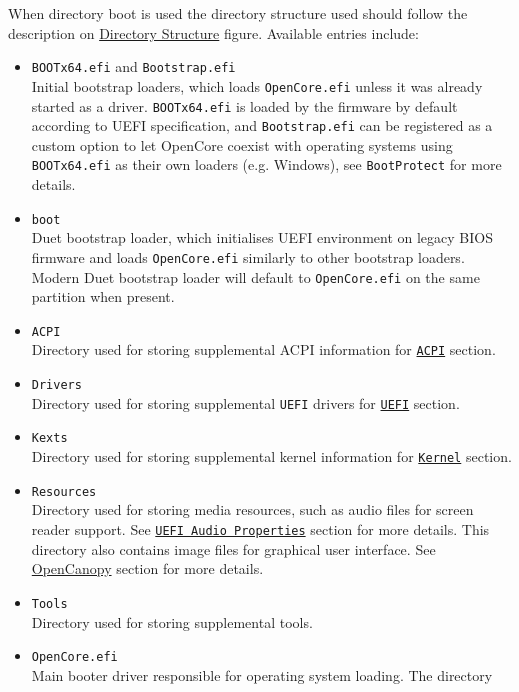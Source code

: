 \documentclass[]{article}
\providecommand{\tightlist}{%
  \setlength{\itemsep}{0pt}\setlength{\parskip}{0pt}}
\begin{document}
When directory boot is used the directory structure used should follow
the description on \hyperref[fig:DS]{Directory Structure} figure. Available
entries include:

\begin{itemize}
\tightlist
\item
  \texttt{BOOTx64.efi} and \texttt{Bootstrap.efi} \\
  Initial bootstrap loaders, which loads \texttt{OpenCore.efi} unless it was
  already started as a driver. \texttt{BOOTx64.efi} is loaded by the firmware
  by default according to UEFI specification, and \texttt{Bootstrap.efi} can
  be registered as a custom option to let OpenCore coexist with operating systems
  using \texttt{BOOTx64.efi} as their own loaders (e.g. Windows), see
  \texttt{BootProtect} for more details.
\item
  \texttt{boot} \\
  Duet bootstrap loader, which initialises UEFI environment on legacy BIOS firmware
  and loads \texttt{OpenCore.efi} similarly to other bootstrap loaders. Modern Duet
  bootstrap loader will default to \texttt{OpenCore.efi} on the same partition when
  present.
\item
  \texttt{ACPI} \\
  Directory used for storing supplemental ACPI information
  for \hyperref[acpi]{\texttt{ACPI}} section.
\item
  \texttt{Drivers} \\
  Directory used for storing supplemental \texttt{UEFI}
  drivers for \hyperref[uefi]{\texttt{UEFI}} section.
\item
  \texttt{Kexts} \\
  Directory used for storing supplemental kernel information
  for \hyperref[kernel]{\texttt{Kernel}} section.
\item
  \texttt{Resources} \\
  Directory used for storing media resources, such as audio files
  for screen reader support. See \hyperref[uefiaudioprops]{\texttt{UEFI Audio Properties}}
  section for more details. This directory also contains image files
  for graphical user interface. See \hyperref[ueficanopy]{OpenCanopy} section for more details.
\item
  \texttt{Tools} \\
  Directory used for storing supplemental tools.
\item
  \texttt{OpenCore.efi} \\
  Main booter driver responsible for operating system loading. The directory

\end{itemize}
\end{document}
